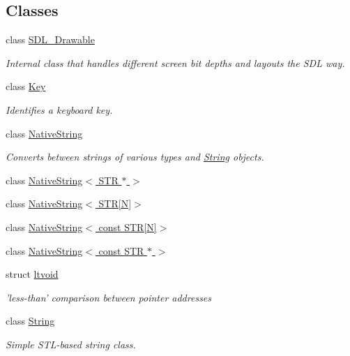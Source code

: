 \subsection*{Classes}
\begin{DoxyCompactItemize}
\item 
class \hyperlink{classGUI_1_1SDL__Drawable}{S\-D\-L\-\_\-\-Drawable}
\begin{DoxyCompactList}\small\item\em Internal class that handles different screen bit depths and layouts the S\-D\-L way. \end{DoxyCompactList}\item 
class \hyperlink{classGUI_1_1Key}{Key}
\begin{DoxyCompactList}\small\item\em Identifies a keyboard key. \end{DoxyCompactList}\item 
class \hyperlink{classGUI_1_1NativeString}{Native\-String}
\begin{DoxyCompactList}\small\item\em Converts between strings of various types and \hyperlink{classGUI_1_1String}{String} objects. \end{DoxyCompactList}\item 
class \hyperlink{classGUI_1_1NativeString_3_01STR_01_5_01_4}{Native\-String$<$ S\-T\-R $\ast$ $>$}
\item 
class \hyperlink{classGUI_1_1NativeString_3_01STR[N]_4}{Native\-String$<$ S\-T\-R\mbox{[}\-N\mbox{]}$>$}
\item 
class \hyperlink{classGUI_1_1NativeString_3_01const_01STR[N]_4}{Native\-String$<$ const S\-T\-R\mbox{[}\-N\mbox{]}$>$}
\item 
class \hyperlink{classGUI_1_1NativeString_3_01const_01STR_01_5_01_4}{Native\-String$<$ const S\-T\-R $\ast$ $>$}
\item 
struct \hyperlink{structGUI_1_1ltvoid}{ltvoid}
\begin{DoxyCompactList}\small\item\em 'less-\/than' comparison between pointer addresses \end{DoxyCompactList}\item 
class \hyperlink{classGUI_1_1String}{String}
\begin{DoxyCompactList}\small\item\em Simple S\-T\-L-\/based string class. \end{DoxyCompactList}\item 

\end{DoxyCompactItemize}
